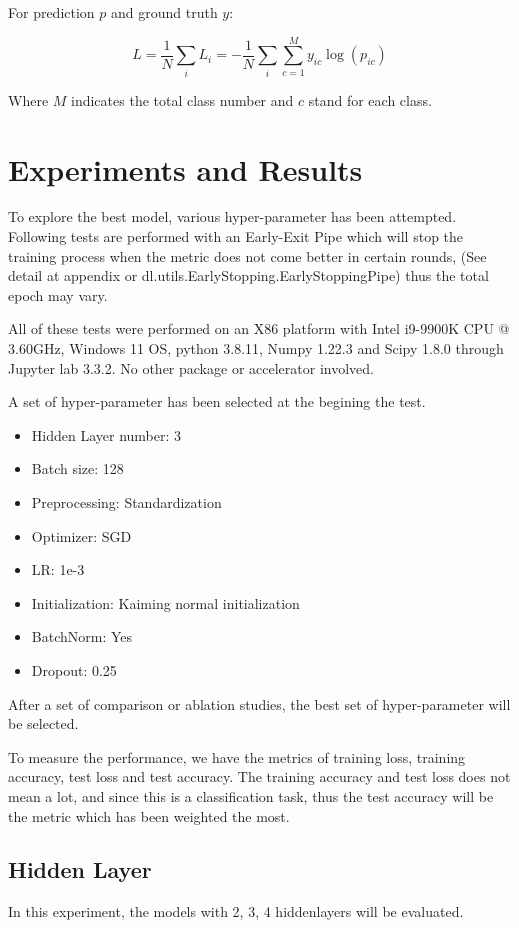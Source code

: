 \documentclass{article}[12pt]
\begin{document}
    For prediction $p$ and ground truth $y$:

\[ L = \frac{1}{N} \sum_i L_i  = -\frac{1}{N}\sum_i \sum^M_{c=1} y_{ic} \log(p_{ic}) \]

    Where $M$ indicates the total class number and $c$ stand for each class.

\section{Experiments and Results}\label{sec:experiments-and-results}
    To explore the best model, various hyper-parameter has been attempted.
    Following tests are performed with an Early-Exit Pipe which will stop the training process
    when the metric does not come better in certain rounds,
    (See detail at appendix or dl.utils.EarlyStopping.EarlyStoppingPipe) thus the total epoch may vary.

    All of these tests were performed on an X86 platform with Intel i9-9900K CPU @ 3.60GHz, Windows 11 OS, python 3.8.11,
    Numpy 1.22.3 and Scipy 1.8.0 through Jupyter lab 3.3.2. No other package or accelerator involved.

    A set of hyper-parameter has been selected at the begining the test.
\begin{itemize}
    \item Hidden Layer number: 3
    \item Batch size: 128
    \item Preprocessing: Standardization
    \item Optimizer: SGD
    \item LR: 1e-3
    \item Initialization: Kaiming normal initialization
    \item BatchNorm: Yes
    \item Dropout: 0.25
\end{itemize}
    After a set of comparison or ablation studies, the best set of hyper-parameter will be selected.

    To measure the performance, we have the metrics of training loss, training accuracy, test loss and test accuracy.
    The training accuracy and test loss does not mean a lot, and since this is a classification task, thus the test
    accuracy will be the metric which has been weighted the most.

\subsection{Hidden Layer}
    In this experiment, the models with 2, 3, 4 hiddenlayers will be evaluated.
\end{document}
